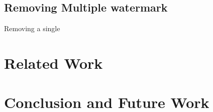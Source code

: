 \documentclass[a4paper]{llncs}
\begin{document}
\subsection{Removing Multiple watermark}

Removing a single 


\section{Related Work}
\label{sec:relatedWork}

\section{Conclusion and Future Work}
\label{sec:conclusion}




\end{document}

